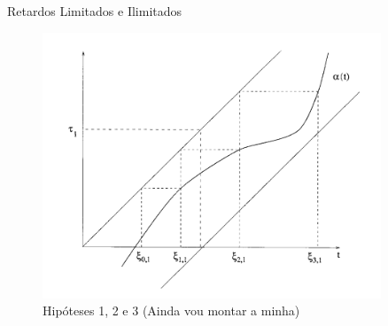 \documentclass{beamer}
\theoremstyle{plain}
\theoremstyle{definition}
\begin{document}

\begin{frame}{Retardos Limitados e Ilimitados}

    \begin{figure}
        \begin{center}
            \includegraphics[width=0.9\textwidth, height=0.7\textheight]{hip123.png}
        \end{center}
        \caption{Hipóteses 1, 2 e 3 (Ainda vou montar a minha)}\label{fig:hip123}
    \end{figure}

\end{frame}


\end{document}
